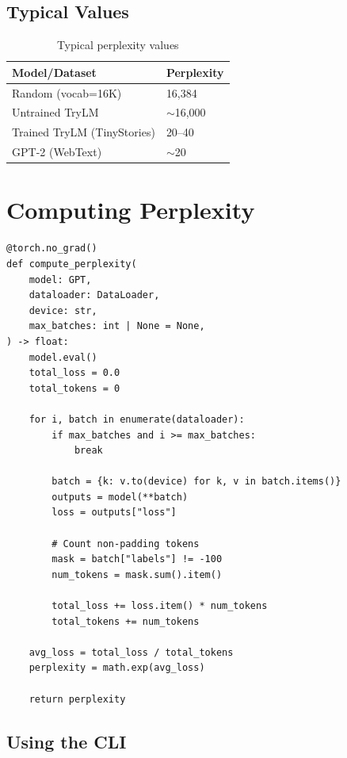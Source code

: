 \subsection{Typical Values}

\begin{table}[H]
\centering
\begin{tabular}{ll}
\toprule
\textbf{Model/Dataset} & \textbf{Perplexity} \\
\midrule
Random (vocab=16K) & 16,384 \\
Untrained TryLM & $\sim$16,000 \\
Trained TryLM (TinyStories) & 20--40 \\
GPT-2 (WebText) & $\sim$20 \\
\bottomrule
\end{tabular}
\caption{Typical perplexity values}
\end{table}

\section{Computing Perplexity}

\begin{lstlisting}[style=python, caption={Perplexity computation from evaluate.py}]
@torch.no_grad()
def compute_perplexity(
    model: GPT,
    dataloader: DataLoader,
    device: str,
    max_batches: int | None = None,
) -> float:
    model.eval()
    total_loss = 0.0
    total_tokens = 0

    for i, batch in enumerate(dataloader):
        if max_batches and i >= max_batches:
            break

        batch = {k: v.to(device) for k, v in batch.items()}
        outputs = model(**batch)
        loss = outputs["loss"]

        # Count non-padding tokens
        mask = batch["labels"] != -100
        num_tokens = mask.sum().item()

        total_loss += loss.item() * num_tokens
        total_tokens += num_tokens

    avg_loss = total_loss / total_tokens
    perplexity = math.exp(avg_loss)

    return perplexity
\end{lstlisting}

\subsection{Using the CLI}

